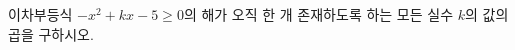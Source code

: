 \hspace*{2mm}\begin{minipage}[t]{\dimexpr\linewidth-2mm\relax}\vspace{0pt}
이차부등식 $-x^2+kx-5\ge 0$의 해가 오직 한 개 존재하도록 하는 모든 실수 $k$의 값의 곱을 구하시오.\end{minipage}
